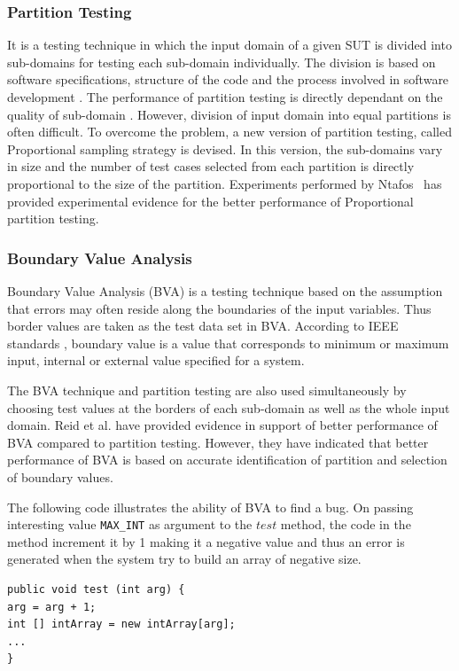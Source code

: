 \subsubsection{Partition Testing}
It is a testing technique in which the input domain of a given SUT is divided into sub-domains for testing each sub-domain individually. The division is based on software specifications, structure of the code and the process involved in software development \cite{hamlet1990}. The performance of partition testing is directly dependant on the quality of sub-domain \cite{weyuker1991analyzing}. However, division of input domain into equal partitions is often difficult. To overcome the problem, a new version of partition testing, called Proportional sampling strategy \cite{Chan1996} is devised. In this version, the sub-domains vary in size and the number of test cases selected from each partition is directly proportional to the size of the partition. Experiments performed by Ntafos~\cite{ntafos1998random} has provided experimental evidence for the better performance of Proportional partition testing.


\subsubsection{Boundary Value Analysis}
Boundary Value Analysis (BVA) is a testing technique based on the assumption that errors may often reside along the boundaries of the input variables. Thus border values are taken as the test data set in BVA. According to IEEE standards \cite{radatz1990ieee}, boundary value is a value that corresponds to minimum or maximum input, internal or external value specified for a system. 

The BVA technique and partition testing are also used simultaneously by choosing test values at the borders of each sub-domain as well as the whole input domain. Reid et al. \cite{reid1997empirical} have provided evidence in support of better performance of BVA compared to partition testing. However, they have indicated that better performance of BVA is based on accurate identification of partition and selection of boundary values.

 The following code illustrates the ability of BVA to find a bug.  On passing interesting value \verb+MAX_INT+ as argument to the $test$ method, the code in the method increment it by 1 making it a negative value and thus an error is generated when the system try to build an array of negative size.

\begin{lstlisting}
public void test (int arg) {
arg = arg + 1;
int [] intArray = new intArray[arg];
...
}
\end{lstlisting}



